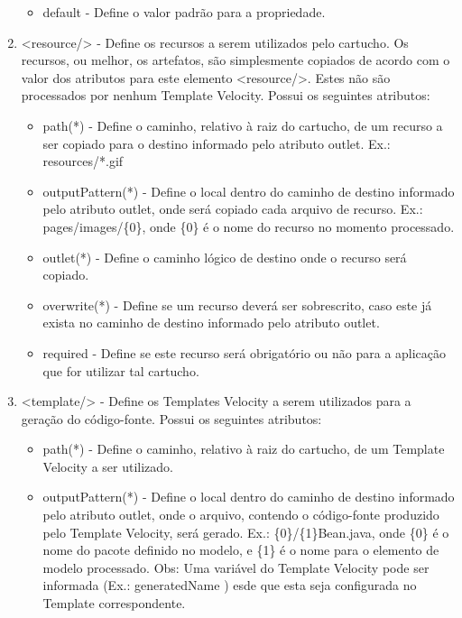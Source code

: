 \begin{enumerate}
\begin{itemize}
		\item default - Define o valor padrão para a propriedade.

	\end{itemize}

	\item <resource/> -	Define os recursos a serem utilizados pelo cartucho. Os
	recursos, ou melhor, os artefatos, são simplesmente copiados de acordo com o
	valor dos atributos para este elemento <resource/>. Estes não são processados
	por nenhum Template Velocity. Possui os seguintes atributos:
	
	\begin{itemize}

		\item path(*) - Define o caminho, relativo à raiz do cartucho, de um
		recurso a ser copiado para o destino informado pelo atributo outlet.
		Ex.: resources/*.gif
		
		\item outputPattern(*) - Define o local dentro do caminho de destino informado
		pelo atributo outlet, onde será copiado cada arquivo de recurso. Ex.:
		pages/images/\{0\}, onde \{0\} é o nome do recurso no momento processado.
		
		\item outlet(*) - Define o caminho lógico de destino onde o recurso será copiado.
		
		\item overwrite(*) - Define se um recurso deverá ser sobrescrito, caso este já exista no caminho de destino informado pelo atributo outlet.
		
		\item required - Define se este recurso será obrigatório ou não para a aplicação
		que for utilizar tal cartucho.
	
	\end{itemize}

	\item <template/> - Define os Templates Velocity a serem utilizados para a
	geração do código-fonte. Possui os seguintes atributos:
	
	\begin{itemize}

		\item path(*) - Define o caminho, relativo à raiz do cartucho, de um Template
		Velocity a ser utilizado.
		
		\item outputPattern(*) - Define o local dentro do caminho de destino informado
		pelo atributo outlet, onde o arquivo, contendo o código-fonte produzido pelo
		Template Velocity, será gerado. Ex.: \{0\}/\{1\}Bean.java, onde \{0\} é o nome
		do pacote definido no modelo, e \{1\} é o nome para o elemento de modelo
		processado.
		Obs: Uma variável do Template Velocity pode ser informada (Ex.:
		\textdollar{}generatedName )  esde que esta seja configurada no Template
		correspondente.
		

\end{itemize}
\end{enumerate}
